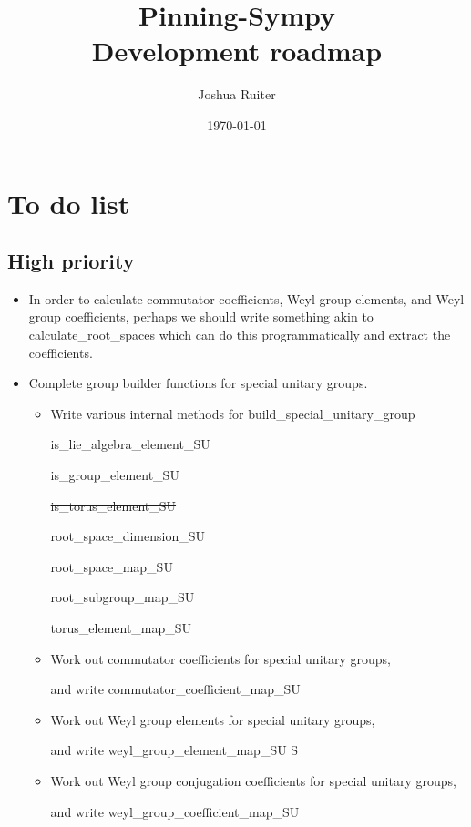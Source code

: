 \documentclass[12pt]{article}
\title{Pinning-Sympy \\
	Development roadmap}
\author{Joshua Ruiter}
\date{\today}
\begin{document}
\maketitle
\tableofcontents

\newpage

\section{To do list}

\subsection{High priority}

\begin{itemize}
	\item In order to calculate commutator coefficients, Weyl group elements, and Weyl group coefficients, perhaps we should write something akin to calculate\_root\_spaces which can do this programmatically and extract the coefficients.

	\item Complete group builder functions for special unitary groups.
	\begin{itemize}
		\item Write various internal methods for build\_special\_unitary\_group

		\sout{is\_lie\_algebra\_element\_SU}
		
		\sout{is\_group\_element\_SU}
		
		\sout{is\_torus\_element\_SU}
		
		\sout{root\_space\_dimension\_SU}
		
		root\_space\_map\_SU
		
		root\_subgroup\_map\_SU
		
		\sout{torus\_element\_map\_SU}

		\item Work out commutator coefficients for special unitary groups, 

and write commutator\_coefficient\_map\_SU

		\item Work out Weyl group elements for special unitary groups, 

and write weyl\_group\_element\_map\_SU
S
		\item Work out Weyl group conjugation coefficients for special unitary groups, 

and write weyl\_group\_coefficient\_map\_SU
	\end{itemize}
\end{itemize}
\end{document}
